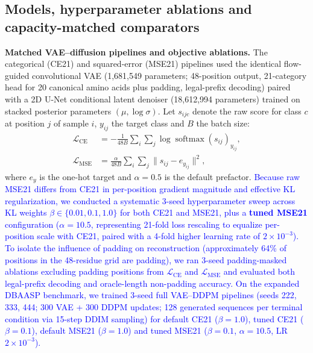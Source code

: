 \documentclass[unnumsec,webpdf,contemporary,large]{oup-authoring-template}
\newcommand{\rev}[1]{\textcolor{blue}{#1}}
\begin{document}
\subsection{Models, hyperparameter ablations and capacity-matched comparators}

\textbf{Matched VAE--diffusion pipelines and objective ablations.} The categorical (CE21) and squared-error (MSE21) pipelines used the identical flow-guided convolutional VAE \cite{refVAE} (1,681,549 parameters; 48-position output, 21-category head for 20 canonical amino acids plus padding, legal-prefix decoding) paired with a 2D U-Net conditional latent denoiser \cite{refDDPM} (18,612,994 parameters) trained on stacked posterior parameters $(\mu, \log\sigma)$. Let $s_{ijc}$ denote the raw score for class $c$ at position $j$ of sample $i$, $y_{ij}$ the target class and $B$ the batch size:
\begin{align*}
\mathcal{L}_{\mathrm{CE}} &= -\frac{1}{48B}\sum_{i}\sum_{j}\log \operatorname{softmax}(s_{ij})_{y_{ij}}, \\
\mathcal{L}_{\mathrm{MSE}} &= \frac{\alpha}{48B}\sum_{i}\sum_{j}\bigl\lVert s_{ij} - e_{y_{ij}} \bigr\rVert^{2},
\end{align*}
where $e_y$ is the one-hot target and $\alpha=0.5$ is the default prefactor. \rev{Because raw MSE21 differs from CE21 in per-position gradient magnitude and effective KL regularization, we conducted a systematic 3-seed hyperparameter sweep across KL weights $\beta\in\{0.01, 0.1, 1.0\}$ for both CE21 and MSE21, plus a \textbf{tuned MSE21} configuration ($\alpha=10.5$, representing 21-fold loss rescaling to equalize per-position scale with CE21, paired with a 4-fold higher learning rate of $2\times 10^{-3}$). To isolate the influence of padding on reconstruction (approximately 64\% of positions in the 48-residue grid are padding), we ran 3-seed padding-masked ablations excluding padding positions from $\mathcal{L}_{\mathrm{CE}}$ and $\mathcal{L}_{\mathrm{MSE}}$ and evaluated both legal-prefix decoding and oracle-length non-padding accuracy. On the expanded DBAASP benchmark, we trained 3-seed full VAE--DDPM pipelines (seeds 222, 333, 444; 300 VAE + 300 DDPM updates; 128 generated sequences per terminal condition via 15-step DDIM sampling) for default CE21 ($\beta=1.0$), tuned CE21 ($\beta=0.1$), default MSE21 ($\beta=1.0$) and tuned MSE21 ($\beta=0.1$, $\alpha=10.5$, LR $2\times 10^{-3}$).}
\end{document}
